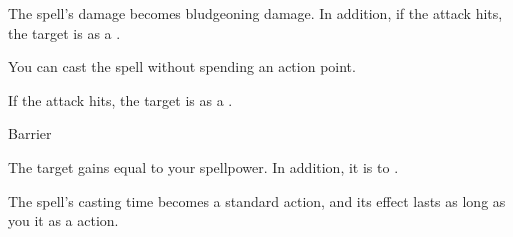 
The spell's damage becomes bludgeoning damage.
In addition, if the attack hits, the target is  as a .






You can cast the spell without spending an action point.






If the attack hits, the target is  as a .





\newpage
\begin{spellsection}{Barrier}

\begin{spellheader}
\end{spellheader}

\begin{spellcontent}

\begin{spelltargetinginfo}



\end{spelltargetinginfo}


\begin{spelleffects}



\spelleffect
The target gains  equal to your spellpower.
In addition, it is  to .








\end{spelleffects}

\end{spellcontent}
\begin{spellfooter}


\end{spellfooter}
\begin{spellsubcontent}


\begin{spellcantrip}
The spell's casting time becomes a standard action, and its effect lasts as long as you  it as a  action.
\end{spellcantrip}


\end{spellsubcontent}
\end{spellsection}


